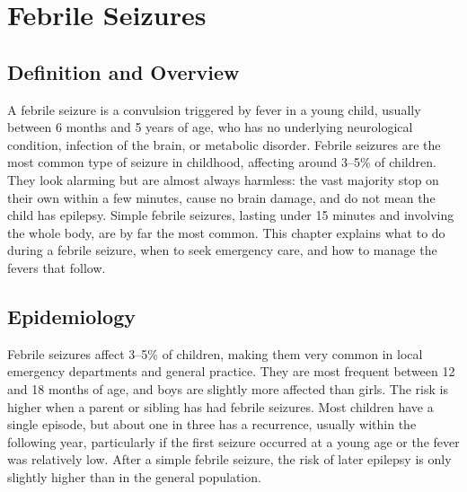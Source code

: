 \chapter{Febrile Seizures}

\section*{Definition and Overview}
A febrile seizure is a convulsion triggered by fever in a young child, usually between 6 months and 5 years of age, who has no underlying neurological condition, infection of the brain, or metabolic disorder. Febrile seizures are the most common type of seizure in childhood, affecting around 3--5\% of children. They look alarming but are almost always harmless: the vast majority stop on their own within a few minutes, cause no brain damage, and do not mean the child has epilepsy. Simple febrile seizures, lasting under 15 minutes and involving the whole body, are by far the most common. This chapter explains what to do during a febrile seizure, when to seek emergency care, and how to manage the fevers that follow.

\section*{Epidemiology}
Febrile seizures affect 3--5\% of children, making them very common in local emergency departments and general practice. They are most frequent between 12 and 18 months of age, and boys are slightly more affected than girls. The risk is higher when a parent or sibling has had febrile seizures. Most children have a single episode, but about one in three has a recurrence, usually within the following year, particularly if the first seizure occurred at a young age or the fever was relatively low. After a simple febrile seizure, the risk of later epilepsy is only slightly higher than in the general population.

